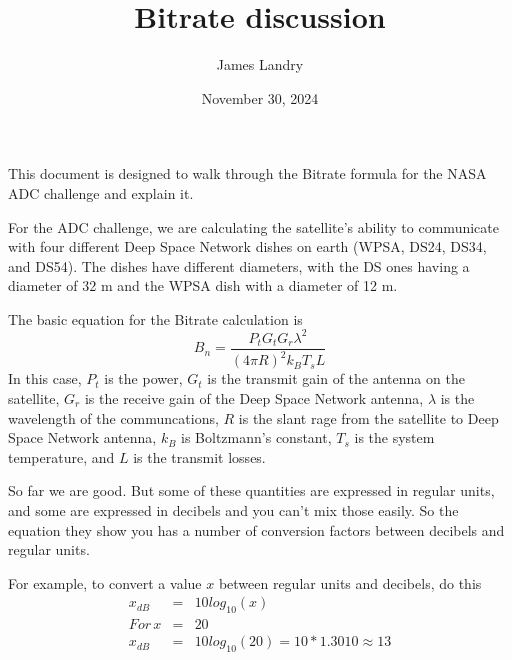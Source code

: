 \documentclass[11pt,twoside]{article}
\begin{document}
\title{Bitrate discussion}
\author{James Landry}
\date{November 30, 2024}
\maketitle

This document is designed to walk through the Bitrate formula for the NASA ADC challenge and explain it.

For the ADC challenge, we are calculating the satellite's ability to communicate with four different Deep Space Network dishes on earth (WPSA, DS24, DS34, and DS54). The dishes have different diameters, with the DS ones having a diameter of 32 m and the WPSA dish with a diameter of 12 m.

The basic equation for the Bitrate calculation is
\begin{equation}
    B_n = \frac{P_t G_t G_r \lambda^2}{(4 \pi R)^2 k_B T_s L}
\end{equation}
In this case, $P_t$ is the power, $G_t$ is the transmit gain of the antenna on the satellite, $G_r$ is the receive gain of the Deep Space Network antenna, $\lambda$ is the wavelength of the communcations, $R$ is the slant rage from the satellite to Deep Space Network antenna, $k_B$ is Boltzmann's constant, $T_s$ is the system temperature, and $L$ is the transmit losses.

So far we are good. But some of these quantities are expressed in regular units, and some are expressed in decibels and you can't mix those easily. So the equation they show you has a number of conversion factors between decibels and regular units.

For example, to convert a value $x$ between regular units and decibels, do this
\begin{eqnarray}
    x_{dB} & = & 10 log_{10}(x) \\
    For \, x & = & 20 \\
    x_{dB} & = & 10 log_{10}(20) = 10 * 1.3010 \approx 13
\end{eqnarray}
    
\end{document}
